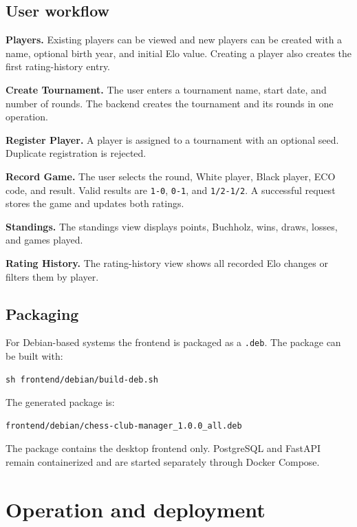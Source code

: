\documentclass[11pt,a4paper]{article}
\begin{document}
\subsection{User workflow}

\textbf{Players.}
Existing players can be viewed and new players can be created with a name,
optional birth year, and initial Elo value. Creating a player also creates the
first rating-history entry.

\textbf{Create Tournament.}
The user enters a tournament name, start date, and number of rounds. The backend
creates the tournament and its rounds in one operation.

\textbf{Register Player.}
A player is assigned to a tournament with an optional seed. Duplicate
registration is rejected.

\textbf{Record Game.}
The user selects the round, White player, Black player, ECO code, and result.
Valid results are \texttt{1-0}, \texttt{0-1}, and
\texttt{1/2-1/2}. A successful request stores the game and updates both
ratings.

\textbf{Standings.}
The standings view displays points, Buchholz, wins, draws, losses, and games
played.

\textbf{Rating History.}
The rating-history view shows all recorded Elo changes or filters them by
player.

\subsection{Packaging}

For Debian-based systems the frontend is packaged as a \texttt{.deb}. The
package can be built with:

\begin{verbatim}
sh frontend/debian/build-deb.sh
\end{verbatim}

The generated package is:

\begin{verbatim}
frontend/debian/chess-club-manager_1.0.0_all.deb
\end{verbatim}

The package contains the desktop frontend only. PostgreSQL and FastAPI remain
containerized and are started separately through Docker Compose.

\section{Operation and deployment}
\end{document}
